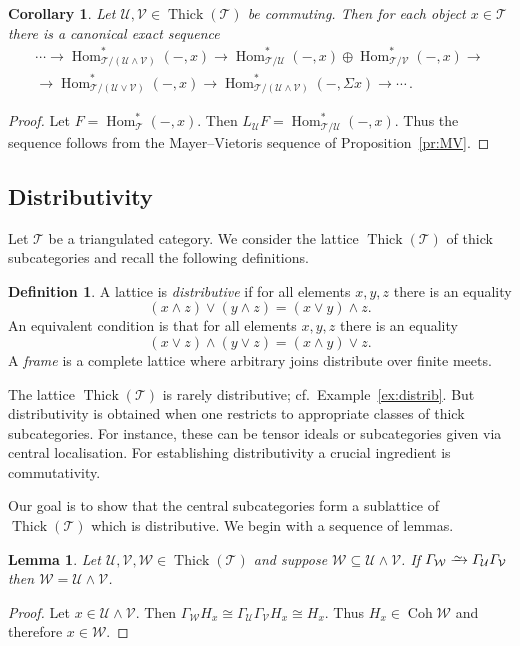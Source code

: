 \documentclass{amsart}[a4]
\newtheorem{corollary}[theorem]{Corollary}
\newtheorem{lemma}[theorem]{Lemma}
\theoremstyle{definition}
\newtheorem{definition}[theorem]{Definition}
\theoremstyle{remark}
\numberwithin{equation}{section}
\newcommand{\Coh}{\operatorname{Coh}}
\newcommand{\Hom}{\operatorname{Hom}}
\newcommand{\Thick}{\operatorname{Thick}}
\newcommand{\iso}{\xrightarrow{\raisebox{-.6ex}[0ex][0ex]{$\scriptstyle{\sim}$}}}
\newcommand{\cat}{\mathcal}
\let\Gamma\varGamma
\let\Sigma\varSigma
\begin{document}
\begin{corollary}
   Let $\cat U,\cat V\in\Thick(\cat T)$ be commuting.  
Then for each object $x\in\cat T$ there is a canonical exact sequence  
\begin{multline*}
  \cdots\to \Hom^*_{\cat T/(\cat U\wedge\cat V)}(-,x)\to \Hom^*_{\cat
    T/\cat U}(-,x)\oplus
  \Hom^*_{\cat T/\cat V}(-,x)\to\\
  \to\Hom^*_{\cat T/(\cat U\vee\cat V)}(-,x)\to\Hom^*_{\cat T/(\cat
    U\wedge\cat V)}(-,\Sigma x)\to\cdots\,.
\end{multline*}
\end{corollary}
\begin{proof}
Let $F=\Hom^*_\cat T(-,x)$. Then $L_\cat U F=\Hom^*_{\cat T/\cat
  U}(-,x)$. Thus the sequence follows from the Mayer--Vietoris sequence of Proposition~\ref{pr:MV}.
\end{proof}



\subsection*{Distributivity}

Let $\cat T$ be a triangulated category. We consider the lattice
$\Thick(\cat T)$ of thick subcategories and recall the following definitions.

\begin{definition}
A lattice is \emph{distributive} if for all elements
$x,y,z$ there is an equality
\[(x\wedge z)\vee(y\wedge z)=(x\vee y)\wedge z.\] An equivalent
condition is that for all elements $x,y,z$ there is an equality
\[(x\vee z)\wedge(y\vee z)=(x\wedge y)\vee z.\] A \emph{frame} is a
complete lattice where arbitrary joins distribute over finite meets.
\end{definition}

The lattice $\Thick(\cat T)$ is rarely distributive; cf.\ Example~\ref{ex:distrib}. But
distributivity is obtained when one restricts to appropriate classes
of thick subcategories. For instance, these can be tensor ideals or
subcategories given via central localisation. For establishing
distributivity a crucial ingredient is commutativity.

Our goal is to show that the central subcategories form a sublattice
of $\Thick(\cat T)$ which is distributive. We begin with a sequence of
lemmas.

\begin{lemma}\label{le:fin-dist}
  Let $\cat U,\cat V,\cat W\in\Thick(\cat T)$ and suppose $\cat W\subseteq\cat U\wedge\cat V$.
If  $\Gamma_{\cat W}\iso\Gamma_\cat U\Gamma_\cat V$ then $\cat W=\cat U\wedge\cat V$.
\end{lemma}
\begin{proof}
Let $x\in \cat U\wedge\cat V$. Then $\Gamma_\cat W
H_x\cong\Gamma_\cat U\Gamma_\cat V H_x\cong H_x$. Thus $H_x\in\Coh\cat W$ and therefore
$x\in\cat W$.
\end{proof}
\end{document}
